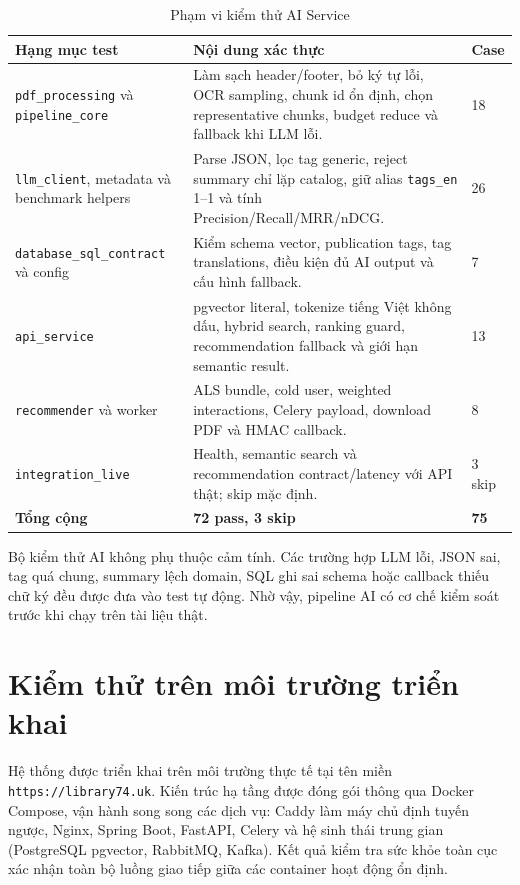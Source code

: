 \begin{table}[H]
\centering
\small
\renewcommand{\arraystretch}{1.35}
\begin{tabularx}{\textwidth}{|p{4cm}|X|p{1.4cm}|}
\hline
\textbf{Hạng mục test} & \textbf{Nội dung xác thực} & \textbf{Case} \\
\hline
\texttt{pdf\_processing} và \texttt{pipeline\_core} & Làm sạch header/footer, bỏ ký tự lỗi, OCR sampling, chunk id ổn định, chọn representative chunks, budget reduce và fallback khi LLM lỗi. & 18 \\
\hline
\texttt{llm\_client}, metadata và benchmark helpers & Parse JSON, lọc tag generic, reject summary chỉ lặp catalog, giữ alias \texttt{tags\_en} 1--1 và tính Precision/Recall/MRR/nDCG. & 26 \\
\hline
\texttt{database\_sql\_contract} và config & Kiểm schema vector, publication tags, tag translations, điều kiện đủ AI output và cấu hình fallback. & 7 \\
\hline
\texttt{api\_service} & pgvector literal, tokenize tiếng Việt không dấu, hybrid search, ranking guard, recommendation fallback và giới hạn semantic result. & 13 \\
\hline
\texttt{recommender} và worker & ALS bundle, cold user, weighted interactions, Celery payload, download PDF và HMAC callback. & 8 \\
\hline
\texttt{integration\_live} & Health, semantic search và recommendation contract/latency với API thật; skip mặc định. & 3 skip \\
\hline
\textbf{Tổng cộng} & \textbf{72 pass, 3 skip} & \textbf{75} \\
\hline
\end{tabularx}
\caption{Phạm vi kiểm thử AI Service}
\label{tab:ai_contract_test_scope}
\end{table}

Bộ kiểm thử AI không phụ thuộc cảm tính. Các trường hợp LLM lỗi, JSON sai, tag
quá chung, summary lệch domain, SQL ghi sai schema hoặc callback thiếu chữ ký
đều được đưa vào test tự động. Nhờ vậy, pipeline AI có cơ chế kiểm soát trước
khi chạy trên tài liệu thật.

\section{Kiểm thử trên môi trường triển khai}

Hệ thống được triển khai trên môi trường thực tế tại tên miền \texttt{https://library74.uk}. Kiến trúc hạ tầng được đóng gói thông qua Docker Compose, vận hành song song các dịch vụ: Caddy làm máy chủ định tuyến ngược, Nginx, Spring Boot, FastAPI, Celery và hệ sinh thái trung gian (PostgreSQL pgvector, RabbitMQ, Kafka). Kết quả kiểm tra sức khỏe toàn cục xác nhận toàn bộ luồng giao tiếp giữa các container hoạt động ổn định.

